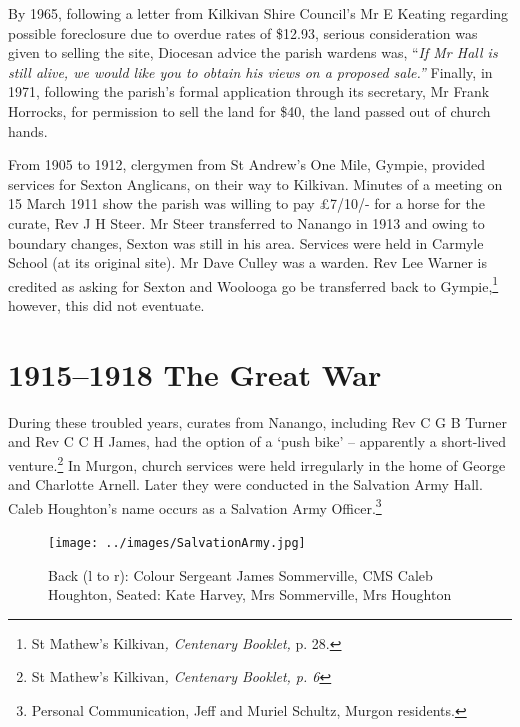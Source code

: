 By 1965, following a letter from Kilkivan Shire Council's Mr E Keating regarding possible foreclosure due to overdue rates of \$12.93, serious consideration was given to selling the site, Diocesan advice the parish wardens was, ``\emph{If Mr Hall is still alive, we would like you to obtain his views on a proposed sale.''} Finally, in 1971, following the parish's formal application through its secretary, Mr Frank Horrocks, for permission to sell the land for \$40, the land passed out of church hands.



From 1905 to 1912, clergymen from St Andrew's One Mile, Gympie, provided services for Sexton Anglicans, on their way to Kilkivan. Minutes of a meeting on 15 March 1911 show the parish was willing to pay \pounds7/10/- for a horse for the curate, Rev J H Steer. Mr Steer transferred to Nanango in 1913 and owing to boundary changes, Sexton was still in his area. Services were held in Carmyle School (at its original site). Mr Dave Culley was a warden. Rev Lee Warner is credited as asking for Sexton and Woolooga go be transferred back to Gympie,\footnote{St Mathew's Kilkivan\emph{, Centenary Booklet,} p. 28.} however, this did not eventuate.


\section{1915--1918 The Great War}



During these troubled years, curates from Nanango, including Rev C G B Turner and Rev C C H James, had the option of a `push bike' -- apparently a short-lived venture.\footnote{St Mathew's Kilkivan\emph{, Centenary Booklet, p. 6}} In Murgon, church services were held irregularly in the home of George and Charlotte Arnell. Later they were conducted in the Salvation Army Hall. Caleb Houghton's name occurs as a Salvation Army Officer.\footnote{Personal Communication, Jeff and Muriel Schultz, Murgon residents.}








\begin{figure}
\begin{center}
\texttt{[image: ../images/SalvationArmy.jpg]}
\caption{Back (l to r): Colour Sergeant James Sommerville, CMS Caleb Houghton, Seated: Kate Harvey, Mrs Sommerville, Mrs Houghton}
\end{center}
\end{figure}




